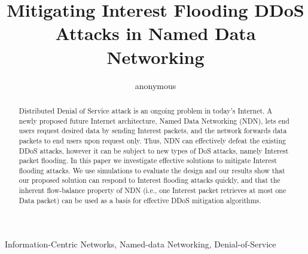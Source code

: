 \documentclass[10pt, conference, compsocconf]{IEEEtran}
\title{Mitigating Interest Flooding DDoS Attacks in Named Data Networking}%
\author{anonymous}
\begin{document}
\maketitle

\begin{abstract}

Distributed Denial of Service attack is an ongoing problem in today's Internet. 
A newly proposed future Internet architecture, Named Data Networking (NDN), lets end users request desired data by sending Interest packets, and the network forwards data packets to end users upon request only. 
Thus, NDN can effectively defeat the existing DDoS attacks, however it can be subject to new types of DoS attacks, namely Interest packet flooding.  
In this paper we investigate effective solutions to mitigate Interest flooding attacks. 
We use simulations to evaluate the design and our results show that our proposed solution can respond to Interest flooding attacks quickly, and that the inherent flow-balance property of NDN (i.e., one Interest packet retrieves at most one Data packet) can be used as a basis for effective DDoS mitigation algorithms.

\end{abstract}

\begin{IEEEkeywords}
Information-Centric Networks, Named-data Networking, Denial-of-Service
\end{IEEEkeywords}




















\end{document}
